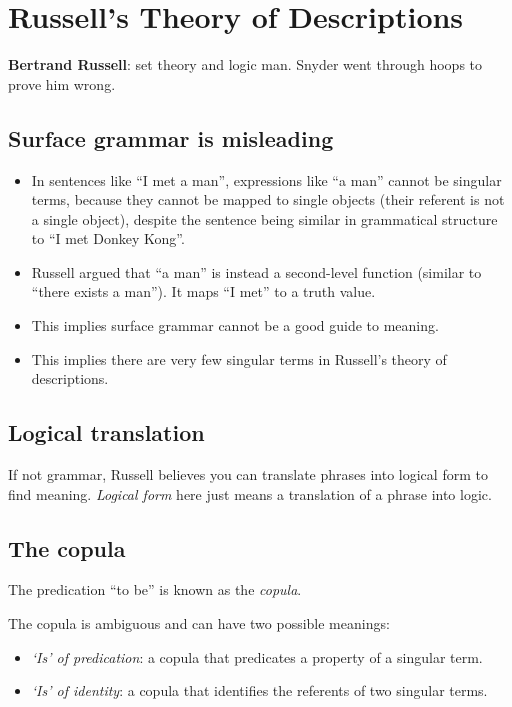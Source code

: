 \chapter{Russell's Theory of Descriptions}

\textbf{Bertrand Russell}: set theory and logic man. Snyder went through hoops to prove him wrong.

\section{Surface grammar is misleading}

\begin{itemize}
  \item In sentences like ``I met a man'', expressions like ``a man'' cannot be singular terms, because they cannot be mapped to single objects (their referent is not a single object), despite the sentence being similar in grammatical structure to ``I met Donkey Kong''.
  \item Russell argued that ``a man'' is instead a second-level function (similar to ``there exists a man''). It maps ``I met'' to a truth value.
  \item This implies surface grammar cannot be a good guide to meaning.
  \item This implies there are very few singular terms in Russell's theory of descriptions.
\end{itemize}

\section{Logical translation}

If not grammar, Russell believes you can translate phrases into logical form to find meaning. \emph{Logical form} here just means a translation of a phrase into logic.

\section{The copula}

\begin{definition}
The predication ``to be'' is known as the \emph{copula}.
\end{definition}

The copula is ambiguous and can have two possible meanings:
\begin{itemize}
  \item \emph{`Is' of predication}: a copula that predicates a property of a singular term.
  \item \emph{`Is' of identity}: a copula that identifies the referents of two singular terms.
\end{itemize}

